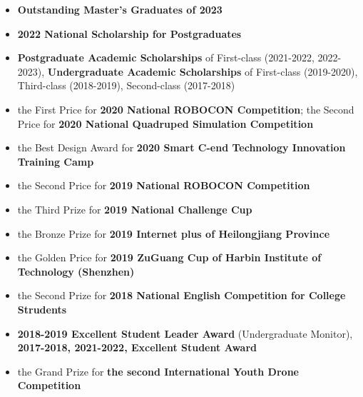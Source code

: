%
%




\begin{itemize}

    \item{\textbf{Outstanding Master's Graduates of 2023}}
    \item {\textbf{2022 National Scholarship for Postgraduates}}

    \item{\textbf{Postgraduate Academic Scholarships} of First-class (2021-2022, 2022-2023)}, {\textbf{Undergraduate Academic Scholarships} of First-class (2019-2020), Third-class (2018-2019), Second-class (2017-2018)}
    
    \item{the First Price for \textbf{2020 National ROBOCON Competition}; the Second Price for \textbf{2020 National Quadruped Simulation Competition}}
    
    \item {the Best Design Award for \textbf{2020 Smart C-end Technology Innovation Training Camp}}
    
    \item{the Second Price for \textbf{2019 National ROBOCON Competition}}
    
    \item{the Third Prize for \textbf{2019 National Challenge Cup}}
    
    \item{the Bronze Prize for \textbf{2019 Internet plus of Heilongjiang Province}}
    \item{the Golden Price for \textbf{2019 ZuGuang Cup of Harbin Institute of Technology (Shenzhen)}}
    
    \item{the Second Prize for \textbf{2018 National English Competition for College Strudents}}
    \item {\textbf{2018-2019 Excellent Student Leader Award} (Undergraduate Monitor), \textbf{2017-2018, 2021-2022, Excellent Student Award}}
    
    \item{the Grand Prize for \textbf{the second International Youth Drone Competition}}
\end{itemize}

